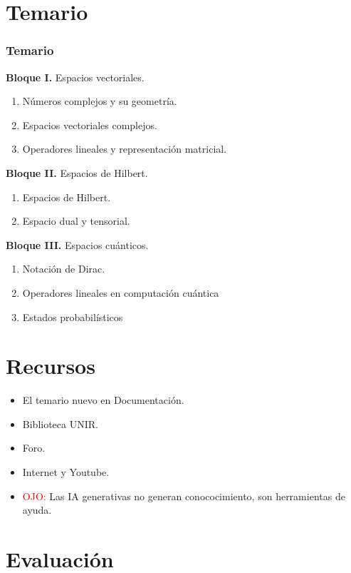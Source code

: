 \documentclass{beamer}
\begin{document}
\section{Temario}
\begin{frame}
  \frametitle{Temario}
  \textbf{Bloque I.} Espacios vectoriales.
  \begin{enumerate}
    \item Números complejos y su geometría.
    \item Espacios vectoriales complejos.
    \item Operadores lineales y representación matricial.
  \end{enumerate}\pause
  \textbf{Bloque II.} Espacios de Hilbert.
  \begin{enumerate}
    \item Espacios de Hilbert.
    \item Espacio dual y tensorial.
  \end{enumerate}\pause
  \textbf{Bloque III.} Espacios cuánticos.
  \begin{enumerate}
    \item Notación de Dirac.
    \item Operadores lineales en computación cuántica
    \item Estados probabilísticos
  \end{enumerate}
\end{frame}

\section{Recursos}
\begin{frame}
  \begin{itemize}
    \item El temario nuevo en Documentación.
    \item Biblioteca UNIR.
    \item Foro.
    \item Internet y Youtube.\pause
    \item \textcolor{red}{OJO:} Las IA generativas no generan conococimiento, son herramientas de ayuda.
  \end{itemize}
\end{frame}

\section{Evaluación}
\end{document}
